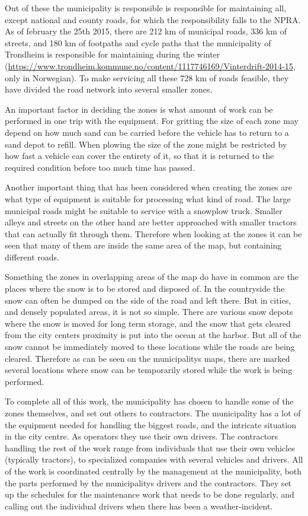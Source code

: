 Out of these the municipality is responsible is responsible for maintaining all, except national and county roads, for which the responsibility falls to the NPRA. As of february the 25th 2015, there are 212 km of municipal roads, 336 km of streets, and 180 km of footpaths and cycle paths that the municipality of Trondheim is responsible for maintaining during the winter (\url{https://www.trondheim.kommune.no/content/1117746169/Vinterdrift-2014-15}, only in Norwegian). To make servicing all these 728 km of roads feasible, they have divided the road network into several smaller zones.

An important factor in deciding the zones is what amount of work can be performed in one trip with the equipment. For gritting the size of each zone may depend on how much sand can be carried before the vehicle has to return to a sand depot to refill. When plowing the size of the zone might be restricted by how fast a vehicle can cover the entirety of it, so that it is returned to the required condition before too much time has passed.

Another important thing that has been considered when creating the zones are what type of equipment is suitable for processing what kind of road. The large municipal roads might be suitable to service with a snowplow truck. Smaller alleys and streets on the other hand are better approached with smaller tractors that can actually fit through them. Therefore when looking at the zones it can be seen that many of them are inside the same area of the map, but containing different roads.

Something the zones in overlapping areas of the map do have in common are the places where the snow is to be stored and disposed of. In the countryside the snow can often be dumped on the side of the road and left there. But in cities, and densely populated areas, it is not so simple. There are various snow depots where the snow is moved for long term storage, and the snow that gets cleared from the city centers proximity is put into the ocean at the harbor. But all of the snow cannot be immediately moved to these locations while the roads are being cleared. Therefore as can be seen on the municipalitys maps, there are marked several locations where snow can be temporarily stored while the work is being performed.

To complete all of this work, the municipality has chosen to handle some of the zones themselves, and set out others to contractors. The municipality has a lot of the equipment needed for handling the biggest roads, and the intricate situation in the city centre. As operators they use their own drivers. The contractors handling the rest of the work range from individuals that use their own vehicles (typically tractors), to specialized companies with several vehicles and drivers. All of the work is coordinated centrally by the management at the municipality, both the parts performed by the municipalitys drivers and the contractors. They set up the schedules for the maintenance work that needs to be done regularly, and calling out the individual drivers when there has been a weather-incident.



